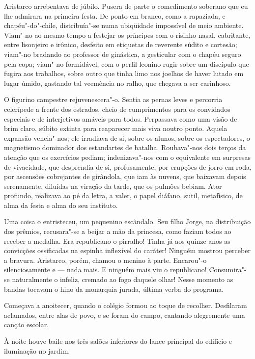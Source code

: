 Aristarco arrebentava de júbilo. Pusera de parte o comedimento soberano que eu
lhe admirara na primeira festa. De ponto em branco, como a rapaziada, e
chapéu"-do"-chile, distribuía"-se numa ubiqüidade impossível de meio
ambiente. Viam"-no ao mesmo tempo a festejar os príncipes com o
risinho nasal, cabritante, entre lisonjeiro e irônico, desfeito em
etiquetas de reverente súdito e cortesão; viam"-no bradando ao
professor de ginástica, a gesticular com o chapéu seguro pela copa;
viam"-no formidável, com o perfil leonino rugir sobre um discípulo que
fugira aos trabalhos, sobre outro que tinha limo nos joelhos de haver
lutado em lugar úmido, gastando tal veemência no ralho, que chegava a
ser carinhoso. 

O figurino campestre rejuvenescera"-o. Sentia as pernas
leves e percorria celerípede a frente dos estrados, cheio de
cumprimentos para os convidados especiais e de interjetivos amáveis
para todos. Perpassava como uma visão de brim claro, súbito extinta
para reaparecer mais viva noutro ponto. Aquela expansão vencia"-nos;
ele irradiava de si, sobre os alunos, sobre os espectadores, o
magnetismo dominador dos estandartes de batalha. Roubava"-nos dois
terços da atenção que os exercícios pediam; indenizava"-nos com o
equivalente em surpresas de vivacidade, que desprendia de si,
profusamente, por erupções de jorro em roda, por ascensões cobrejantes
de girândola, que iam às nuvens, que baixavam depois serenamente,
diluídas na viração da tarde, que os pulmões bebiam. Ator profundo,
realizava ao pé da letra, a valer, o papel diáfano, sutil, metafísico,
de alma da festa e alma do seu instituto. 

Uma coisa o entristeceu, um pequenino escândalo. Seu filho Jorge, 
na distribuição dos prêmios, recusara"-se a beijar a mão da princesa, 
como faziam todos ao receber a medalha. Era republicano o pirralho! 
Tinha já aos quinze anos as
convicções ossificadas na espinha inflexível do caráter! Ninguém
mostrou perceber a bravura. Aristarco, porém, chamou o menino à parte.
Encarou"-o silenciosamente e --- nada mais. E ninguém mais viu o
republicano! Consumira"-se naturalmente o infeliz, cremado ao fogo
daquele olhar! Nesse momento as bandas tocavam o hino da monarquia
jurada, última verba do programa. 

Começava a anoitecer, quando o
colégio formou ao toque de recolher. Desfilaram aclamados, entre alas
de povo, e se foram do campo, cantando alegremente uma canção escolar.

À noite houve baile nos três salões inferiores do lance principal do
edifício e iluminação no jardim. 

